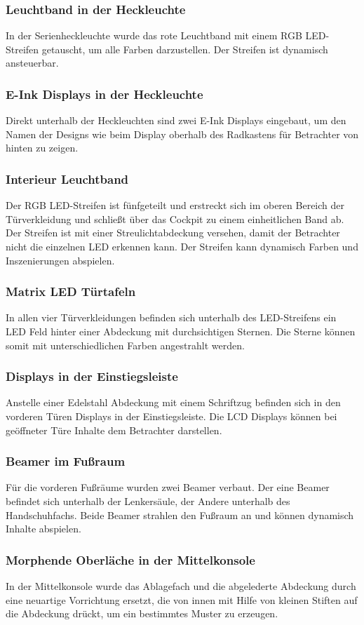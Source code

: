 \subsubsection{Leuchtband in der Heckleuchte}
In der Serienheckleuchte wurde das rote Leuchtband mit einem RGB LED-Streifen getauscht, um alle Farben darzustellen. Der Streifen ist dynamisch ansteuerbar.
\subsubsection{E-Ink Displays in der Heckleuchte}
Direkt unterhalb der Heckleuchten sind zwei E-Ink Displays eingebaut, um den Namen der Designs wie beim Display oberhalb des Radkastens für Betrachter von hinten zu zeigen.
\subsubsection{Interieur Leuchtband}
Der RGB LED-Streifen ist fünfgeteilt und erstreckt sich im oberen Bereich der Türverkleidung und schließt über das Cockpit zu einem einheitlichen Band ab. Der Streifen ist mit einer Streulichtabdeckung versehen, damit der Betrachter nicht die einzelnen LED erkennen kann. Der Streifen kann dynamisch Farben und Inszenierungen abspielen.
\subsubsection{Matrix LED Türtafeln}
In allen vier Türverkleidungen befinden sich unterhalb des LED-Streifens ein LED Feld hinter einer Abdeckung mit durchsichtigen Sternen. Die Sterne können somit mit unterschiedlichen Farben angestrahlt werden. 
\subsubsection{Displays in der Einstiegsleiste}
Anstelle einer Edelstahl Abdeckung mit einem Schriftzug befinden sich in den vorderen Türen Displays in der Einstiegsleiste. Die LCD Displays können bei geöffneter Türe Inhalte dem Betrachter darstellen.
\subsubsection{Beamer im Fußraum}
Für die vorderen Fußräume wurden zwei Beamer verbaut. Der eine Beamer befindet sich unterhalb der Lenkersäule, der Andere unterhalb des Handschuhfachs. Beide Beamer strahlen den Fußraum an und können dynamisch Inhalte abspielen.
\subsubsection{Morphende Oberläche in der Mittelkonsole}
In der Mittelkonsole wurde das Ablagefach und die abgelederte Abdeckung durch eine neuartige Vorrichtung ersetzt, die von innen mit Hilfe von kleinen Stiften auf die Abdeckung drückt, um ein bestimmtes Muster zu erzeugen.

